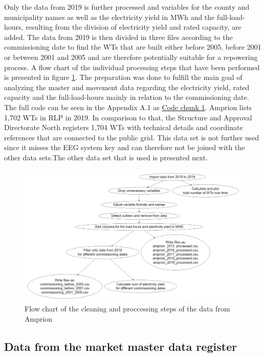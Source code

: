 \documentclass[a4paper,11pt]{article}
\begin{document}
Only the data from 2019 is further processed and variables for the county and municipality names as well as the electricity yield in MWh and the full-load-hours, resulting from the division of electricity yield and rated capacity, are added. The data from 2019 is then divided in three files according to the commissioning date to find the WTs that are built either before 2005, before 2001 or between 2001 and 2005 and are therefore potentially suitable for a repowering process. A flow chart of the individual processing steps that have been performed is presented in figure \ref{fig:preparation}. The preparation was done to fulfill the main goal of analyzing the master and movement data regarding the electricity yield, rated capacity and the full-load-hours mainly in relation to the commissioning date. The full code can be seen in the Appendix A.1 as \protect\hyperlink{code-chunk-1}{Code chunk 1}. Amprion lists 1,702 WTs in RLP in 2019. In comparison to that, the Structure and Approval Directorate North registers 1,704 WTs with technical details and coordinate references that are connected to the public grid. This data set is not further used since it misses the EEG system key and can therefore not be joined with the other data sets.The other data set that is used is presented next.
\begin{figure}

{\centering \includegraphics[width=1\linewidth]{data/Amprion/results_of_preparation/prepflow} 

}

\caption{Flow chart of the cleaning and proccessing steps of the data from Amprion}\label{fig:preparation}
\end{figure}
\hypertarget{data-from-the-market-master-data-register}{%
\subsection{Data from the market master data register}\label{data-from-the-market-master-data-register}}
\end{document}
